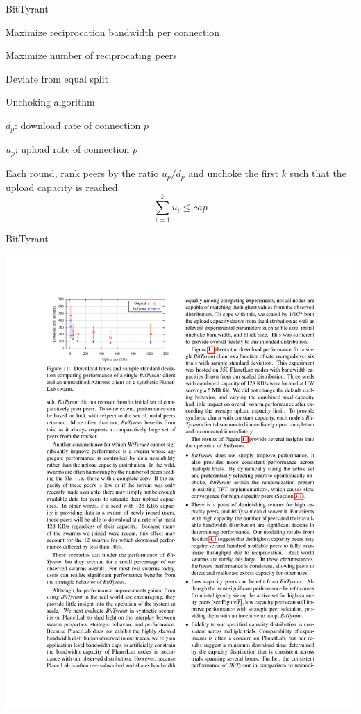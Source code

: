 \begin{frame}{BitTyrant}

\BI
\item Maximize reciprocation bandwidth per connection
\item Maximize number of reciprocating peers
\item Deviate from equal split
\EI

\smallskip
\begin{block}{Unchoking algorithm}
\BI
\item $d_p$: download rate of connection $p$
\item $u_p$: upload rate of connection $p$
\item Each round, rank peers by the ratio $u_p/d_p$ and unchoke the first
$k$ such that the upload capacity is reached:
\[
\sum_{i=1}^k u_i \leq \mathit{cap}
\]
\EI
\end{block}
\end{frame}

\begin{frame}{BitTyrant}

\includegraphics[width=\textwidth]{bittyrant1}

\end{frame}

